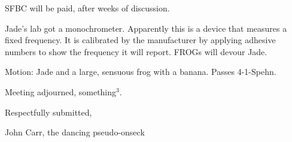 \documentclass[12pt]{article}
\begin{document}
SFBC will be paid, after weeks of discussion.

Jade's lab got a monochrometer.  Apparently this is a device that
measures a fixed frequency.  It is calibrated by the manufacturer
by applying adhesive numbers to show the frequency it will report.
FROGs will devour Jade.

Motion: Jade and a large, sensuous frog with a banana.  Passes \hbox{4-1-Spehn}.

\vspace{12pt}

\noindent
Meeting adjourned, something$^3$.

\vspace{18pt}

\centerline{Respectfully submitted,}
\centerline{John Carr, the dancing pseudo-onseck}
\end{document}
